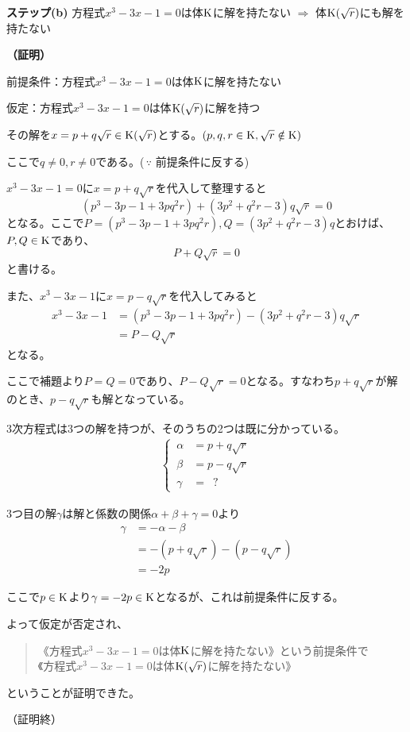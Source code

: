 \begin{itembox}[l]{\bf ステップ(b)}
方程式$x^3 -3x -1 = 0$は体$\mathrm{K}$に解を持たない $\Longrightarrow$ 体$\mathrm{K}(\sqrt{r})$にも解を持たない
\end{itembox}
{\bf （証明）}\par
前提条件：方程式$x^3 -3x -1 = 0$は体$\mathrm{K}$に解を持たない\par
仮定：方程式$x^3 -3x -1 = 0$は体$\mathrm{K}(\sqrt{r})$に解を持つ\par
その解を$x = p + q\sqrt{r} \in \mathrm{K}(\sqrt{r})$とする。$(p,q,r \in \mathrm{K}, \sqrt{r} \notin \mathrm{K})$\par
ここで$q \neq 0, r \neq 0$である。(\,$\because$ 前提条件に反する)\par
$x^3 -3x -1 = 0$に$x = p + q\sqrt{r}$を代入して整理すると
$$ (p^3 - 3p - 1 + 3pq^2r) + (3p^2 + q^2r - 3)q\sqrt{r} = 0 $$
となる。ここで$P = (p^3 - 3p - 1 + 3pq^2r), Q = (3p^2 + q^2r - 3)q$とおけば、$P,Q \in \mathrm{K}$であり、
$$ P + Q\sqrt{r} = 0 $$
と書ける。\par
また、$x^3 -3x -1$に$x = p - q\sqrt{r}$を代入してみると
\begin{align*}
  x^3 -3x -1 &= (p^3 - 3p - 1 + 3pq^2r) - (3p^2 + q^2r - 3)q\sqrt{r}\\
  &= P - Q\sqrt{r}
\end{align*}
となる。\par
ここで補題より$P = Q = 0$であり、$P - Q\sqrt{r} = 0$となる。すなわち$p + q\sqrt{r}$が解のとき、$p - q\sqrt{r}$も解となっている。\par
3次方程式は3つの解を持つが、そのうちの2つは既に分かっている。
\begin{align*}
  \begin{cases}
    \,\alpha &= p + q\sqrt{r}\\
    \,\beta &= p - q\sqrt{r}\\
    \,\gamma &= \,\,\,?
  \end{cases}
\end{align*}\par
3つ目の解$\gamma$は解と係数の関係$\alpha + \beta + \gamma = 0$より
\begin{align*}
  \gamma &= - \alpha - \beta \\
  &= -(p + q\sqrt{r}) - (p - q\sqrt{r})\\
  &= -2p
\end{align*}\par
ここで$p \in \mathrm{K}$より$\gamma = -2p \in \mathrm{K}$となるが、これは前提条件に反する。\par
よって仮定が否定され、
\begin{quote}
  《方程式$x^3 -3x -1 = 0$は体$\mathrm{K}$に解を持たない》という前提条件で\\
  《方程式$x^3 -3x -1 = 0$は体$\mathrm{K}(\sqrt{r})$に解を持たない》
\end{quote}
ということが証明できた。
\begin{flushright}
  （証明終）
\end{flushright}

